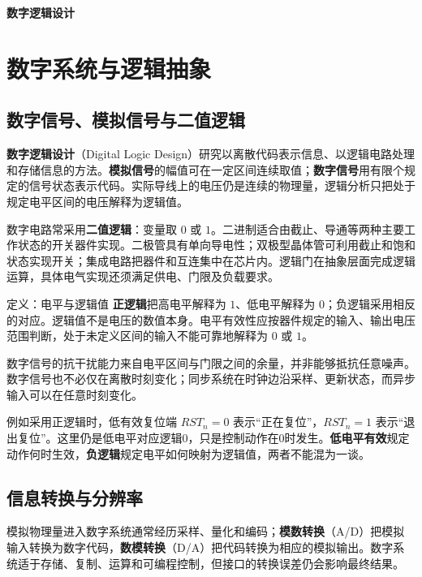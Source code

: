 \documentclass[UTF8,fontset=none,zihao=-4,a4paper]{ctexart}
\newcommand{\term}[1]{\textbf{#1}}
\begin{document}
\begin{titlepage}\thispagestyle{empty}\vspace*{0.28\textheight}
\begin{center}{\fontsize{36}{45}\selectfont\bfseries 数字逻辑设计}\end{center}
\end{titlepage}
\thispagestyle{empty}
\begingroup\linespread{1.05}\selectfont\tableofcontents\endgroup\clearpage
{}

\section{数字系统与逻辑抽象}
\subsection{数字信号、模拟信号与二值逻辑}
\term{数字逻辑设计}（Digital Logic Design）研究以离散代码表示信息、以逻辑电路处理和存储信息的方法。\term{模拟信号}的幅值可在一定区间连续取值；\term{数字信号}用有限个规定的信号状态表示代码。实际导线上的电压仍是连续的物理量，逻辑分析只把处于规定电平区间的电压解释为逻辑值。

数字电路常采用\term{二值逻辑}：变量取 $0$ 或 $1$。二进制适合由截止、导通等两种主要工作状态的开关器件实现。二极管具有单向导电性；双极型晶体管可利用截止和饱和状态实现开关；集成电路把器件和互连集中在芯片内。逻辑门在抽象层面完成逻辑运算，具体电气实现还须满足供电、门限及负载要求。

\begin{infobox}{定义：电平与逻辑值}
\term{正逻辑}把高电平解释为 $1$、低电平解释为 $0$；负逻辑采用相反的对应。逻辑值不是电压的数值本身。电平有效性应按器件规定的输入、输出电压范围判断，处于未定义区间的输入不能可靠地解释为 $0$ 或 $1$。
\end{infobox}
数字信号的抗干扰能力来自电平区间与门限之间的余量，并非能够抵抗任意噪声。数字信号也不必仅在离散时刻变化；同步系统在时钟边沿采样、更新状态，而异步输入可以在任意时刻变化。

例如采用正逻辑时，低有效复位端 $RST_n=0$ 表示“正在复位”，$RST_n=1$ 表示“退出复位”。这里仍是低电平对应逻辑0，只是控制动作在0时发生。\term{低电平有效}规定动作何时生效，\term{负逻辑}规定电平如何映射为逻辑值，两者不能混为一谈。

\subsection{信息转换与分辨率}
模拟物理量进入数字系统通常经历采样、量化和编码；\term{模数转换}（A/D）把模拟输入转换为数字代码，\term{数模转换}（D/A）把代码转换为相应的模拟输出。数字系统适于存储、复制、运算和可编程控制，但接口的转换误差仍会影响最终结果。
\end{document}
